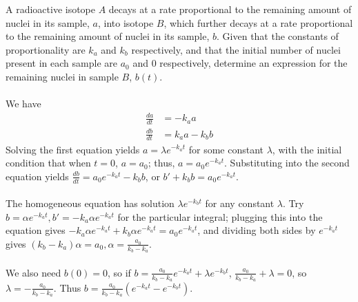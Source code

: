 \documentclass{article}
\begin{document}
\begin{example}
A radioactive isotope $A$ decays at a rate proportional to the remaining amount of nuclei in its sample, $a$, into isotope $B$, which further decays at a rate proportional to the remaining amount of nuclei in its sample, $b$. Given that the constants of proportionality are $k_a$ and $k_b$ respectively, and that the initial number of nuclei present in each sample are $a_0$ and 0 respectively, determine an expression for the remaining nuclei in sample $B$, $b(t)$.
\\ \\
We have
\begin{equation*}
    \begin{aligned}
        \frac{da}{dt} &= -k_a a \\
        \frac{db}{dt} &= k_a a - k_b b
    \end{aligned}
\end{equation*}
Solving the first equation yields $a = \lambda e^{-k_a t}$ for some constant $\lambda$, with the initial condition that when $t=0$, $a=a_0$; thus, $a=a_0 e^{-k_a t}$. Substituting into the second equation yields $\frac{db}{dt} = a_0 e^{-k_a t} - k_b b$, or $b' + k_b b = a_0 e^{-k_a t}$. \\ \\ The homogeneous equation has solution $\lambda e^{-k_b t}$ for any constant $\lambda$. Try $b = \alpha e^{-k_a t}, b' = -k_a \alpha e^{-k_a t}$ for the particular integral; 
plugging this into the equation gives $-k_a \alpha e^{-k_a t} + k_b \alpha e^{-k_a t} = a_0 e^{-k_a t}$, and dividing both sides by $e^{-k_a t}$ gives $(k_b - k_a)\alpha = a_0, \alpha = \frac{a_0}{k_b - k_a}$. \\ \\ 
We also need $b(0) = 0$, so if $b = \frac{a_0}{k_b - k_a}e^{-k_a t} + \lambda e^{-k_b t}$, $\frac{a_0}{k_b - k_a} + \lambda = 0$, so $\lambda = -\frac{a_0}{k_b - k_a}$. Thus $b = \frac{a_0}{k_b - k_a}(e^{-k_a t} - e^{-k_b t}).$ 
\end{example}
\end{document}
